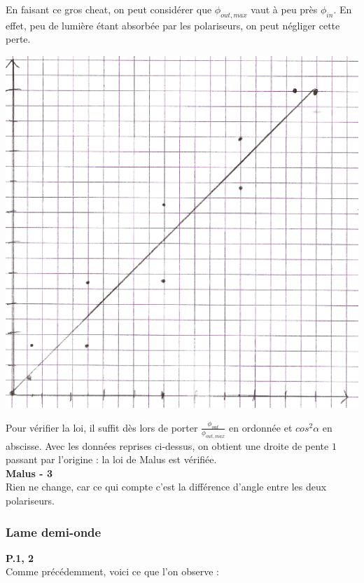 \documentclass	[11pt, a4paper, openany]{book}
\begin{document}
En faisant ce gros cheat, on peut considérer que $\phi_{out, max}$ vaut à peu près $\phi_{in}$. En effet, peu de lumière étant absorbée par les polariseurs, on peut négliger cette perte.
\begin{center}
\includegraphics[scale=0.5]{labo/image25.png}
\end{center}
Pour vérifier la loi, il suffit dès lors de porter $\frac{\phi_{out}}{\phi_{out, max}}$ en ordonnée et $cos^2\alpha$ en abscisse. Avec les données reprises ci-dessus, on obtient une droite de pente $1$ passant par l'origine : la loi de Malus est vérifiée.\\

\textbf{Malus - 3}\\
Rien ne change, car ce qui compte c'est la différence d'angle entre les deux polariseurs.

\subsubsection*{Lame demi-onde}
\textbf{P.1, 2}\\
Comme précédemment, voici ce que l'on observe : \\
\end{document}
